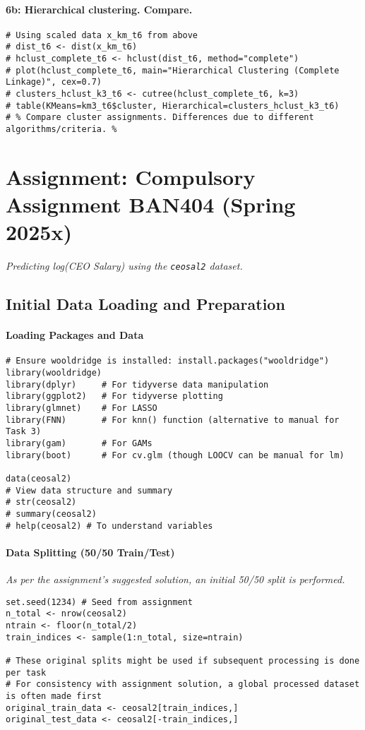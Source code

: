 \documentclass[12pt,a4paper]{article}
\newcommand{\Rcode}[1]{\texttt{#1}} %
\begin{document}
            \paragraph{6b: Hierarchical clustering. Compare.}
\begin{lstlisting}
# Using scaled data x_km_t6 from above
# dist_t6 <- dist(x_km_t6)
# hclust_complete_t6 <- hclust(dist_t6, method="complete")
# plot(hclust_complete_t6, main="Hierarchical Clustering (Complete Linkage)", cex=0.7)
# clusters_hclust_k3_t6 <- cutree(hclust_complete_t6, k=3)
# table(KMeans=km3_t6$cluster, Hierarchical=clusters_hclust_k3_t6)
# % Compare cluster assignments. Differences due to different algorithms/criteria. %
\end{lstlisting}

\section{Assignment: Compulsory Assignment BAN404 (Spring 2025x)}
\textit{Predicting log(CEO Salary) using the \Rcode{ceosal2} dataset.}
\vspace{0.5em}

    \subsection{Initial Data Loading and Preparation}
        \paragraph{Loading Packages and Data}
\begin{lstlisting}
# Ensure wooldridge is installed: install.packages("wooldridge")
library(wooldridge)
library(dplyr)     # For tidyverse data manipulation
library(ggplot2)   # For tidyverse plotting
library(glmnet)    # For LASSO
library(FNN)       # For knn() function (alternative to manual for Task 3)
library(gam)       # For GAMs
library(boot)      # For cv.glm (though LOOCV can be manual for lm)

data(ceosal2)
# View data structure and summary
# str(ceosal2)
# summary(ceosal2)
# help(ceosal2) # To understand variables
\end{lstlisting}

        \paragraph{Data Splitting (50/50 Train/Test)}
            \textit{As per the assignment's suggested solution, an initial 50/50 split is performed.}
\begin{lstlisting}[caption={Splitting data into 50/50 training and test sets}]
set.seed(1234) # Seed from assignment
n_total <- nrow(ceosal2)
ntrain <- floor(n_total/2)
train_indices <- sample(1:n_total, size=ntrain)

# These original splits might be used if subsequent processing is done per task
# For consistency with assignment solution, a global processed dataset is often made first
original_train_data <- ceosal2[train_indices,]
original_test_data <- ceosal2[-train_indices,]
\end{lstlisting}
\end{document}
